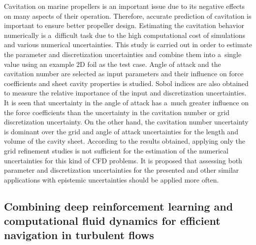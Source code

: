 \documentclass[a4paper,10pt]{article}
\begin{document}
Cavitation on marine propellers is an important issue due to its negative effects on many aspects of their operation. Therefore, accurate prediction of cavitation is important to ensure better propeller design. Estimating the cavitation behavior numerically is a~difficult task due to the high computational cost of simulations and various numerical uncertainties. This study is carried out in order to estimate the parameter and discretization uncertainties and combine them into a~single value using an example 2D foil as the test case. Angle of attack and the cavitation number are selected as input parameters and their influence on force coefficients and sheet cavity properties is studied. Sobol indices are also obtained to measure the relative importance of the input and discretization uncertainties. It is seen that uncertainty in the angle of attack has a~much greater influence on the force coefficients than the uncertainty in the cavitation number or grid discretization uncertainty. On the other hand, the cavitation number uncertainty is dominant over the grid and angle of attack uncertainties for the length and volume of the cavity sheet. According to the results obtained, applying only the grid refinement studies is not sufficient for the estimation of the numerical uncertainties for this kind of CFD problems. It is proposed that assessing both parameter and discretization uncertainties for the presented and other similar applications with epistemic uncertainties should be applied more often.

\subsection{Combining deep reinforcement learning and computational fluid dynamics for efficient navigation in turbulent flows \cite{lidtke_combining_2023}}
\end{document}

